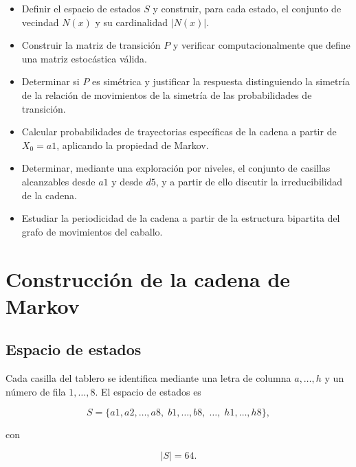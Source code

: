 \documentclass[12pt,a4paper]{article}
\begin{document}
\begin{itemize}

    \item Definir el espacio de estados \(S\) y construir, para cada
    estado, el conjunto de vecindad \(N(x)\) y su cardinalidad
    \(|N(x)|\).

    \item Construir la matriz de transición \(P\) y verificar
    computacionalmente que define una matriz estocástica válida.

    \item Determinar si \(P\) es simétrica y justificar la respuesta
    distinguiendo la simetría de la relación de movimientos de la
    simetría de las probabilidades de transición.

    \item Calcular probabilidades de trayectorias específicas de la
    cadena a partir de \(X_0=a1\), aplicando la propiedad de Markov.

    \item Determinar, mediante una exploración por niveles, el conjunto
    de casillas alcanzables desde \(a1\) y desde \(d5\), y a partir de
    ello discutir la irreducibilidad de la cadena.

    \item Estudiar la periodicidad de la cadena a partir de la
    estructura bipartita del grafo de movimientos del caballo.

\end{itemize}


\section{Construcción de la cadena de Markov}

\subsection{Espacio de estados}

Cada casilla del tablero se identifica mediante una letra de columna
\(a,\ldots,h\) y un número de fila \(1,\ldots,8\). El espacio de
estados es

\[
S=\{a1,a2,\ldots,a8,\;b1,\ldots,b8,\;\ldots,\;h1,\ldots,h8\},
\]

con

\[
|S|=64.
\]
\end{document}
